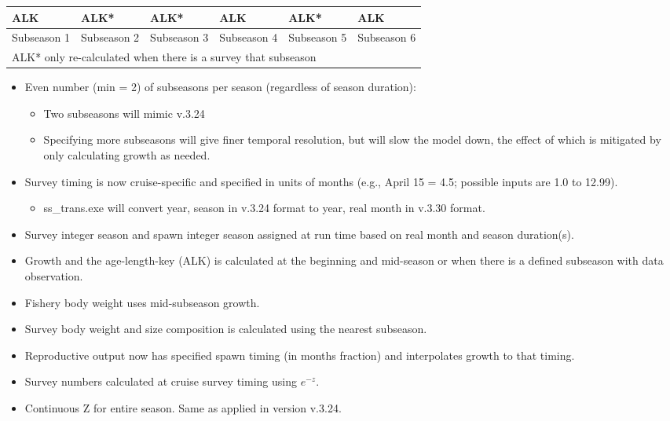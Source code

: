 \begin{center}
	\begin{tabular}{| p{2.37cm}| p{2.37cm}|  p{2.37cm}|  p{2.37cm}|  p{2.37cm}|  p{2.37cm}|  }
		\hline
		ALK & ALK* & ALK* & ALK & ALK* & ALK \Tstrut\Bstrut\\
		\hline
		Subseason 1 & Subseason 2 & Subseason 3 & Subseason 4 & Subseason 5 & Subseason 6 \Tstrut\Bstrut\\		
		\hline
		\multicolumn{6}{l}{ALK* only re-calculated when there is a survey that subseason }\Tstrut\Bstrut\\		
	\end{tabular}
\end{center}

	\begin{itemize}
		\item Even number (min = 2) of subseasons per season (regardless of season duration):
			\begin{itemize}
				\item Two subseasons will mimic v.3.24
				\item Specifying more subseasons will give finer temporal resolution, but will slow the model down, the effect of which is mitigated by only calculating growth as needed.
			\end{itemize}
		\item Survey timing is now cruise-specific and specified in units of months (e.g., April 15 = 4.5; possible inputs are 1.0 to 12.99).
			\begin{itemize}
				\item ss\_trans.exe will convert year, season in v.3.24 format to year, real month in v.3.30 format.
			\end{itemize}
		\item Survey integer season and spawn integer season assigned at run time based on real month and season duration(s).
		\item Growth and the age-length-key (ALK) is calculated at the beginning and mid-season or when there is a defined subseason with data observation.
		\item Fishery body weight uses mid-subseason growth.
		\item Survey body weight and size composition is calculated using the nearest subseason.
		\item Reproductive output now has specified spawn timing (in months fraction) and interpolates growth to that timing.
		\item Survey numbers calculated at cruise survey timing using $e^{-z}$.
		\item Continuous Z for entire season.  Same as applied in version v.3.24.
	\end{itemize}

